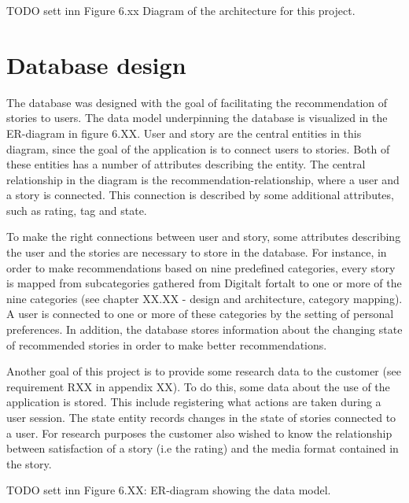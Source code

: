 TODO sett inn Figure 6.xx Diagram of the architecture for this project.

\section{Database design}

The database was designed with the goal of facilitating the recommendation of stories to users. The data model underpinning the database is visualized in the ER-diagram in figure 6.XX. User and story are the central entities in this diagram, since the goal of the application is to connect users to stories. Both of these entities has a number of attributes describing the entity. The central relationship in the diagram is the recommendation-relationship, where a user and a story is connected. This connection is described by some additional attributes, such as rating, tag and state. \newline

To make the right connections between user and story, some attributes describing the user and the stories are necessary to store in the database. For instance, in order to make recommendations based on nine predefined categories, every story is mapped from subcategories gathered from Digitalt fortalt to one or more of the nine categories (see chapter XX.XX - design and architecture, category mapping). A user is connected to one or more of these categories by the setting of personal preferences. In addition, the database stores information about the changing state of recommended stories in order to make better recommendations. \newline

Another goal of this project is to provide some research data to the customer (see requirement RXX in appendix XX). To do this, some data about the use of the application is stored. This include registering what actions are taken during a user session. The state entity records changes in the state of stories connected to a user. For research purposes the customer also wished to know the relationship between satisfaction of a story (i.e the rating) and the media format contained in the story.

TODO sett inn Figure 6.XX: ER-diagram showing the data model.\newline

